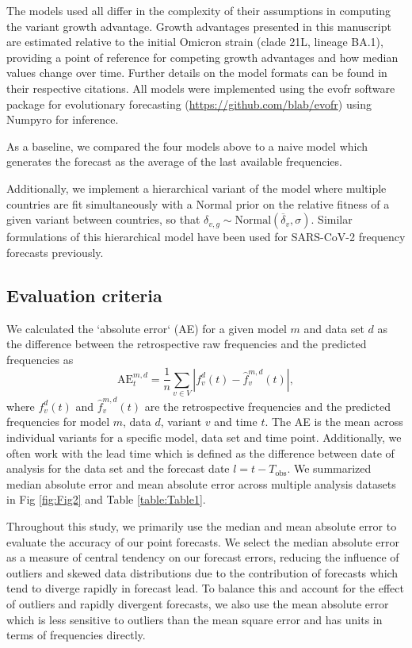 \documentclass[10pt,letterpaper]{article}
\begin{document}
The models used all differ in the complexity of their assumptions in computing the variant growth advantage.
Growth advantages presented in this manuscript are estimated relative to the initial Omicron strain (clade 21L, lineage BA.1), providing a point of reference for competing growth advantages and how median values change over time.
Further details on the model formats can be found in their respective citations.
All models were implemented using the evofr software package for evolutionary forecasting (\href{https://github.com/blab/evofr}{https://github.com/blab/evofr}) using Numpyro for inference.

As a baseline, we compared the four models above to a naive model which generates the forecast as the average of the last available frequencies.

Additionally, we implement a hierarchical variant of the model where multiple countries are fit simultaneously with a Normal prior on the relative fitness of a given variant between countries, so that $\delta_{v, g} \sim \text{Normal}(\overline{\delta}_{v}, \sigma)$.
Similar formulations of this hierarchical model have been used for SARS-CoV-2 frequency forecasts previously. \cite{susswein2023leveraging}

\subsection*{Evaluation criteria}

We calculated the `absolute error` (AE) for a given model $m$ and data set $d$ as the difference between the retrospective raw frequencies and the predicted frequencies as
\begin{equation}
    \mathrm{AE}_{t}^{m,d} = \frac{1}{n} \sum_{v \in V} \left|f_{v}^{d}(t) - \hat{f}^{m,d}_{v}(t) \right|,
\end{equation}
where $f_{v}^{d}(t)$ and $\hat{f}_{v}^{m,d}(t)$ are the retrospective frequencies and the predicted frequencies for model $m$, data $d$, variant $v$ and time $t$.
The AE is the mean across individual variants for a specific model, data set and time point.
Additionally, we often work with the lead time which is defined as the difference between date of analysis for the data set and the forecast date $l = t - T_{\text{obs}}$.
We summarized median absolute error and mean absolute error across multiple analysis datasets in Fig \ref{fig:Fig2} and Table \ref{table:Table1}.

Throughout this study, we primarily use the median and mean absolute error to evaluate the accuracy of our point forecasts.
We select the median absolute error as a measure of central tendency on our forecast errors, reducing the influence of outliers and skewed data distributions due to the contribution of forecasts which tend to diverge rapidly in forecast lead.
To balance this and account for the effect of outliers and rapidly divergent forecasts, we also use the mean absolute error which is less sensitive to outliers than the mean square error and has units in terms of frequencies directly.
\end{document}
